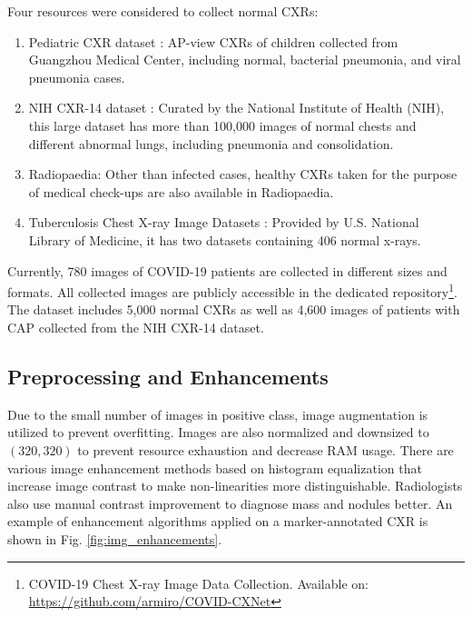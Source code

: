 \documentclass{article}
\newcommand\numOfImages{780}
\begin{document}
Four resources were considered to collect normal CXRs:
\begin{enumerate}
    \item Pediatric CXR dataset \cite{kermany2018identifying}: AP-view CXRs of children collected from Guangzhou Medical Center, including normal, bacterial pneumonia, and viral pneumonia cases.
    \item NIH CXR-14 dataset \cite{wang2017chestx}: Curated by the National Institute of Health (NIH), this large dataset has more than 100,000 images of normal chests and different abnormal lungs, including pneumonia and consolidation.
    \item Radiopaedia: Other than infected cases, healthy CXRs taken for the purpose of medical check-ups are also available in Radiopaedia.
    \item Tuberculosis Chest X-ray Image Datasets \cite{jaeger2014two}: Provided by U.S. National Library of Medicine, it has two datasets containing 406 normal x-rays.
\end{enumerate}

Currently, \numOfImages{} images of COVID-19 patients are collected in different sizes and formats. All collected images are publicly accessible in the dedicated repository\footnote{COVID-19 Chest X-ray Image Data Collection. Available on: \href{https://github.com/armiro/COVID-CXNet}{https://github.com/armiro/COVID-CXNet}}. The dataset includes 5,000 normal CXRs as well as 4,600 images of patients with CAP collected from the NIH CXR-14 dataset. 







\subsection{Preprocessing and Enhancements}

Due to the small number of images in positive class, image augmentation is utilized to prevent overfitting. Images are also normalized and downsized to \((320, 320)\) to prevent resource exhaustion and decrease RAM usage. There are various image enhancement methods based on histogram equalization that increase image contrast to make non-linearities more distinguishable. Radiologists also use manual contrast improvement to diagnose mass and nodules better. An example of enhancement algorithms applied on a marker-annotated CXR is shown in Fig. \ref{fig:img_enhancements}.
\end{document}
